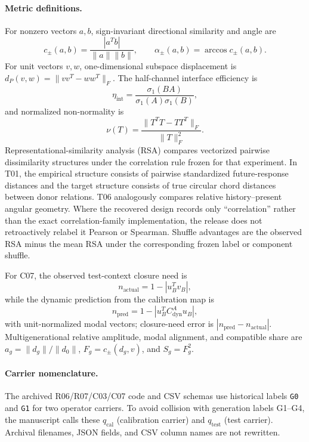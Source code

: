 \documentclass[11pt]{article}
\begin{document}
\paragraph{Metric definitions.}
For nonzero vectors $a,b$, sign-invariant directional similarity and angle are
\begin{equation}
 c_{\pm}(a,b)=\frac{|a^Tb|}{\|a\|\|b\|},\qquad \alpha_{\pm}(a,b)=\arccos c_{\pm}(a,b).
\end{equation}
For unit vectors $v,w$, one-dimensional subspace displacement is $d_P(v,w)=\|vv^T-ww^T\|_F$. The half-channel interface efficiency is
\begin{equation}
 \eta_{\mathrm{int}}=\frac{\sigma_1(BA)}{\sigma_1(A)\sigma_1(B)},
\end{equation}
and normalized non-normality is
\begin{equation}
 \nu(T)=\frac{\|T^TT-TT^T\|_F}{\|T\|_F^2}.
\end{equation}
Representational-similarity analysis (RSA) compares vectorized pairwise dissimilarity structures under the correlation rule frozen for that experiment. In T01, the empirical structure consists of pairwise standardized future-response distances and the target structure consists of true circular chord distances between donor relations. T06 analogously compares relative history--present angular geometry. Where the recovered design records only ``correlation'' rather than the exact correlation-family implementation, the release does not retroactively relabel it Pearson or Spearman. Shuffle advantages are the observed RSA minus the mean RSA under the corresponding frozen label or component shuffle.

For C07, the observed test-context closure need is
\begin{equation}
 n_{\mathrm{actual}}=1-|u_B^Tv_B|,
\end{equation}
while the dynamic prediction from the calibration map is
\begin{equation}
 n_{\mathrm{pred}}=1-|u_B^T C_{\mathrm{dyn}}^{A}u_B|,
\end{equation}
with unit-normalized modal vectors; closure-need error is $|n_{\mathrm{pred}}-n_{\mathrm{actual}}|$. Multigenerational relative amplitude, modal alignment, and compatible share are $a_g=\|d_g\|/\|d_0\|$, $F_g=c_{\pm}(d_g,v)$, and $S_g=F_g^2$.

\paragraph{Carrier nomenclature.}
The archived R06/R07/C03/C07 code and CSV schemas use historical labels \texttt{G0} and \texttt{G1} for two operator carriers. To avoid collision with generation labels G1--G4, the manuscript calls these $q_{\mathrm{cal}}$ (calibration carrier) and $q_{\mathrm{test}}$ (test carrier). Archival filenames, JSON fields, and CSV column names are not rewritten.
\end{document}
